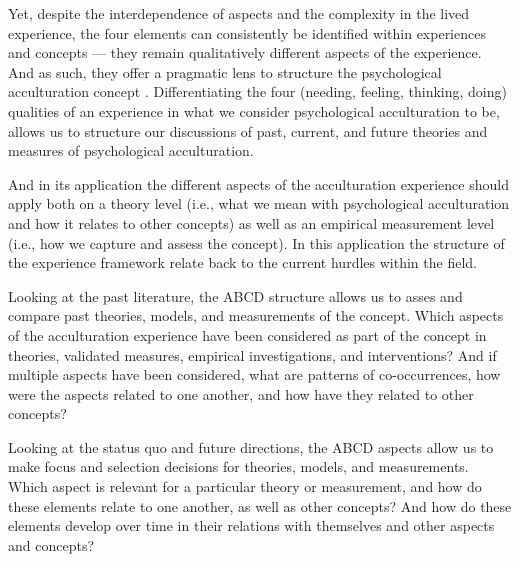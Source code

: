 \documentclass[man, 12pt, a4paper]{apa7}
\begin{document}
Yet, despite the interdependence of aspects and the complexity in the lived experience, the four elements can consistently be identified within experiences and concepts --- they remain qualitatively different aspects of the experience. And as such, they offer a pragmatic lens to structure the psychological acculturation concept \citep{Kuhn1962}. Differentiating the four (needing, feeling, thinking, doing) qualities of an experience in what we consider psychological acculturation to be, allows us to structure our discussions of past, current, and future theories and measures of psychological acculturation.

And in its application the different aspects of the acculturation experience should apply both on a theory level (i.e., what we mean with psychological acculturation and how it relates to other concepts) as well as an empirical measurement level (i.e., how we capture and assess the concept). In this application the structure of the experience framework relate back to the current hurdles within the field.

Looking at the past literature, the ABCD structure allows us to asses and compare past theories, models, and measurements of the concept. Which aspects of the acculturation experience have been considered as part of the concept in theories, validated measures, empirical investigations, and interventions? And if multiple aspects have been considered, what are patterns of co-occurrences, how were the aspects related to one another, and how have they related to other concepts?

Looking at the status quo and future directions, the ABCD aspects allow us to make focus and selection decisions for theories, models, and measurements. Which aspect is relevant for a particular theory or measurement, and how do these elements relate to one another, as well as other concepts? And how do these elements develop over time in their relations with themselves and other aspects and concepts?
\end{document}
